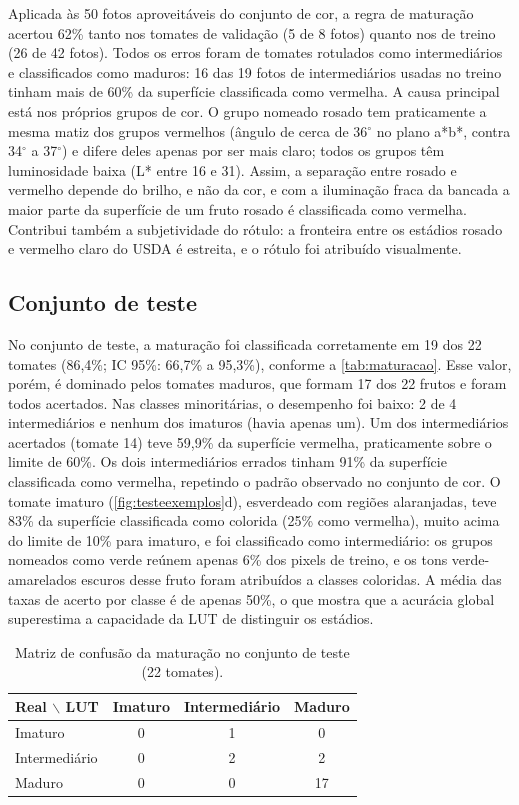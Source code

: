 Aplicada às 50 fotos aproveitáveis do conjunto de cor, a regra de maturação acertou 62\% tanto nos tomates de validação (5 de 8 fotos) quanto nos de treino (26 de 42 fotos). Todos os erros foram de tomates rotulados como intermediários e classificados como maduros: 16 das 19 fotos de intermediários usadas no treino tinham mais de 60\% da superfície classificada como vermelha. A causa principal está nos próprios grupos de cor. O grupo nomeado rosado tem praticamente a mesma matiz dos grupos vermelhos (ângulo de cerca de 36$^\circ$ no plano a*b*, contra 34$^\circ$ a 37$^\circ$) e difere deles apenas por ser mais claro; todos os grupos têm luminosidade baixa (L* entre 16 e 31). Assim, a separação entre rosado e vermelho depende do brilho, e não da cor, e com a iluminação fraca da bancada a maior parte da superfície de um fruto rosado é classificada como vermelha. Contribui também a subjetividade do rótulo: a fronteira entre os estádios rosado e vermelho claro do USDA é estreita, e o rótulo foi atribuído visualmente.

\subsection{Conjunto de teste}

No conjunto de teste, a maturação foi classificada corretamente em 19 dos 22 tomates (86,4\%; IC 95\%: 66,7\% a 95,3\%), conforme a \autoref{tab:maturacao}. Esse valor, porém, é dominado pelos tomates maduros, que formam 17 dos 22 frutos e foram todos acertados. Nas classes minoritárias, o desempenho foi baixo: 2 de 4 intermediários e nenhum dos imaturos (havia apenas um). Um dos intermediários acertados (tomate 14) teve 59,9\% da superfície vermelha, praticamente sobre o limite de 60\%. Os dois intermediários errados tinham 91\% da superfície classificada como vermelha, repetindo o padrão observado no conjunto de cor. O tomate imaturo (\autoref{fig:testeexemplos}d), esverdeado com regiões alaranjadas, teve 83\% da superfície classificada como colorida (25\% como vermelha), muito acima do limite de 10\% para imaturo, e foi classificado como intermediário: os grupos nomeados como verde reúnem apenas 6\% dos pixels de treino, e os tons verde-amarelados escuros desse fruto foram atribuídos a classes coloridas. A média das taxas de acerto por classe é de apenas 50\%, o que mostra que a acurácia global superestima a capacidade da LUT de distinguir os estádios.

\begin{table}[htb]
	\centering
	\caption{\label{tab:maturacao}Matriz de confusão da maturação no conjunto de teste (22 tomates).}
	\begin{tabular}{lccc}
		\toprule
		Real $\backslash$ LUT & Imaturo & Intermediário & Maduro \\
		\midrule
		Imaturo & 0 & 1 & 0 \\
		Intermediário & 0 & 2 & 2 \\
		Maduro & 0 & 0 & 17 \\
		\bottomrule
	\end{tabular}
\end{table}

